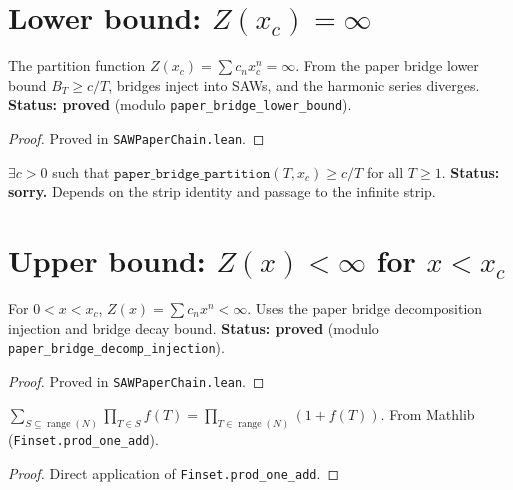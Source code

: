 \section{Lower bound: $Z(x_c) = \infty$}

\begin{theorem}\label{thm:Z_xc_diverges_corrected}
\leanok
{}
  The partition function $Z(x_c) = \sum c_n x_c^n = \infty$.
  From the paper bridge lower bound $B_T \geq c/T$, bridges inject into SAWs,
  and the harmonic series diverges.
  \textbf{Status: proved} (modulo \texttt{paper\_bridge\_lower\_bound}).
\end{theorem}
\begin{proof}
\leanok
{}
  Proved in \texttt{SAWPaperChain.lean}.
\end{proof}

\begin{theorem}\label{thm:paper_bridge_lower}
  $\exists c > 0$ such that $\texttt{paper\_bridge\_partition}(T, x_c) \geq c/T$ for all $T \geq 1$.
  \textbf{Status: sorry.} Depends on the strip identity and passage to the infinite strip.
\end{theorem}

\section{Upper bound: $Z(x) < \infty$ for $x < x_c$}

\begin{theorem}\label{thm:hw_summable_corrected}
\leanok
{}
  For $0 < x < x_c$, $Z(x) = \sum c_n x^n < \infty$.
  Uses the paper bridge decomposition injection and bridge decay bound.
  \textbf{Status: proved} (modulo \texttt{paper\_bridge\_decomp\_injection}).
\end{theorem}
\begin{proof}
\leanok
{}
  Proved in \texttt{SAWPaperChain.lean}.
\end{proof}

\begin{lemma}\label{lem:powerset_prod}
\leanok
  $\displaystyle
  \sum_{S \subseteq \operatorname{range}(N)} \prod_{T \in S} f(T)
  = \prod_{T \in \operatorname{range}(N)} (1 + f(T)).
  $
  From Mathlib (\texttt{Finset.prod\_one\_add}).
\end{lemma}
\begin{proof}
\leanok
  Direct application of \texttt{Finset.prod\_one\_add}.
\end{proof}

